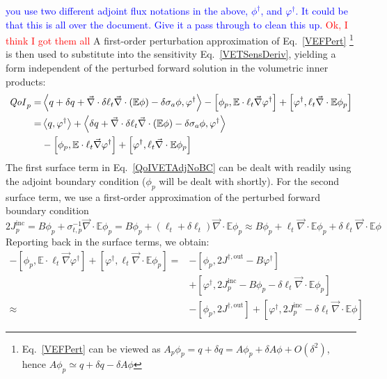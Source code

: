 \documentclass[12pt]{report}
\newcommand{\bra}{\left\langle}
\newcommand{\ket}{\right\rangle}
\newcommand{\sbra}{\left[}
\newcommand{\sket}{\right]}
\renewcommand{\div}{\vec{\nabla} \cdot}
\newcommand{\grad}{\vec{\nabla}}
\newcommand{\vefadj}{\varphi^\dag}
\newcommand{\Edd}{\mathbb{E}}
\newcommand{\siga}{\sigma_a}
\newcommand{\isigt}{\ell_t}
\newcommand{\scalSource}{q}
\newcommand{\qoi}{{\it QoI}\xspace}
\newcommand{\comment}[2]{\marginpar{\textcolor{#2}{$\star$}}\textcolor{#2}{#1}\newline}
\newcommand{\iwh}[1]{\comment{#1}{red}}
\newcommand{\jcr}[1]{\comment{#1}{blue}}
\newcommand{\iwh}[1]{\phantom{a}}
\newcommand{\jcr}[1]{\phantom{a}}
\begin{document}
\jcr{you use two different adjoint flux notations in the above, $\phi^\dag$, and $\vefadj $. It could be that this is all over the document. Give it a pass through to clean this up.} \iwh{Ok, I think I got them all}
A first-order perturbation approximation of Eq.~\eqref{VEFPert}
\footnote{Eq.~\eqref{VEFPert} can be viewed as $A_p \phi_p = q+\delta q = A \phi_p + \delta A \phi + O(\delta^2)$, hence $A \phi_p  \simeq  q+\delta q -\delta A \phi$} is then used to substitute into the sensitivity Eq.~\eqref{VETSensDeriv}, yielding a form independent of the perturbed forward solution in the volumetric inner products:
\begin{equation}
\label{QoIVETAdjNoBC}
\begin{split}
\qoi_p =& \bra \scalSource + \delta \scalSource + \div \delta \isigt \div \left( \Edd \phi \right) - \delta \siga \phi, \vefadj \ket - \sbra \phi_p, \Edd \cdot \isigt \grad \vefadj \sket + \sbra \vefadj, \isigt \div \Edd \phi_p \sket \\
=& \bra q, \vefadj \ket  + \bra \delta \scalSource + \div \delta \isigt \div \left( \Edd \phi \right)  - \delta \siga \phi, \vefadj \ket \\
& - \sbra \phi_p, \Edd \cdot \isigt \grad \vefadj \sket + \sbra \vefadj, \isigt \div \Edd \phi_p \sket 
\end{split}
\end{equation}
The first surface term in Eq.~\eqref{QoIVETAdjNoBC} 
can be dealt with readily using the adjoint boundary condition ($\phi_p$ will be dealt with shortly). For the second surface term, we use a first-order approximation of the perturbed forward boundary condition  
\[
2 J_p^{\text{inc}} = B \phi_p + \sigma_{t,p}^{-1}\div \Edd \phi_p
= B \phi_p + (\isigt + \delta \isigt) \div \Edd \phi_p
\approx B \phi_p + \isigt  \div \Edd \phi_p + \delta \isigt  \div \Edd \phi
\]
Reporting back in the surface terms, we obtain:
\begin{equation}
\begin{split}
 - \sbra \phi_p, \Edd \cdot \isigt \grad \vefadj \sket  + \sbra \vefadj, \isigt \div \Edd \phi_p \sket 
=&- \sbra \phi_p, 2J^{\dag,\text{out}} - B \vefadj \sket \\ 
&+ \sbra \vefadj, 2 J_p^{\text{inc}} - B \phi_p - \delta \isigt \div \Edd \phi_p \sket \\
\approx&- \sbra \phi_p, 2J^{\dag,\text{out}} \sket + \sbra \vefadj, 2 J_p^{\text{inc}} - \delta \isigt \div \Edd \phi \sket 
\end{split}
\end{equation}
\end{document}
